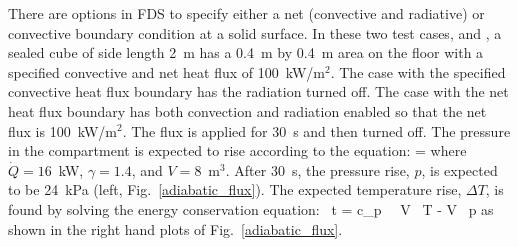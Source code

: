 \documentclass[11pt]{book}
\begin{document}
There are options in FDS to specify either a net (convective and radiative) or convective boundary condition at a solid surface. In these two test cases,  and , a sealed cube of side length 2~m has a 0.4~m by 0.4~m area on the floor with a specified convective and net heat flux of 100~kW/m$^2$. The case with the specified convective heat flux boundary has the radiation turned off. The case with the net heat flux boundary has both convection and radiation enabled so that the net flux is 100~kW/m$^2$. The flux is applied for 30~s and then turned off. The pressure in the compartment is expected to rise according to the equation:
\be
    = 
\ee
where $\dot{Q}=16$~kW, $\gamma=1.4$, and $V=8$~m$^3$. After 30~s, the pressure rise, $p$, is expected to be 24~kPa (left, Fig.~\ref{adiabatic_flux}). The expected temperature rise, $\Delta T$, is found by solving the energy conservation equation:
\be
    \, \Delta t = c_p \, \rho \, V \, \Delta T - V \, \Delta p
\ee
as shown in the right hand plots of Fig.~\ref{adiabatic_flux}.
\end{document}
